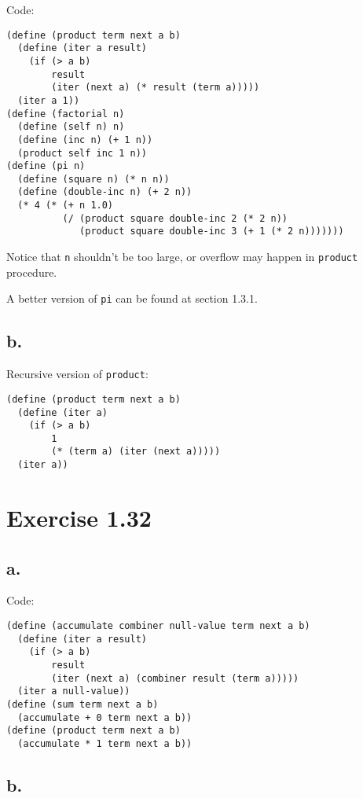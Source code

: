 \documentclass[../main.tex]{subfiles}
\begin{document}
Code:

\begin{lstlisting}
(define (product term next a b)
  (define (iter a result)
    (if (> a b)
        result
        (iter (next a) (* result (term a)))))
  (iter a 1))
(define (factorial n)
  (define (self n) n)
  (define (inc n) (+ 1 n))
  (product self inc 1 n))
(define (pi n)
  (define (square n) (* n n))
  (define (double-inc n) (+ 2 n))
  (* 4 (* (+ n 1.0)
          (/ (product square double-inc 2 (* 2 n))
             (product square double-inc 3 (+ 1 (* 2 n)))))))
\end{lstlisting}

Notice that \lstinline{n} shouldn't be
 too large, or overflow may happen in
 \lstinline{product} procedure.

A better version of \lstinline{pi} can
 be found at section 1.3.1.

\subsection*{b.}

Recursive version of \lstinline{product}:

\begin{lstlisting}
(define (product term next a b)
  (define (iter a)
    (if (> a b)
        1
        (* (term a) (iter (next a)))))
  (iter a))
\end{lstlisting}

\section{Exercise 1.32}

\subsection*{a.}

Code:

\begin{lstlisting}
(define (accumulate combiner null-value term next a b)
  (define (iter a result)
    (if (> a b)
        result
        (iter (next a) (combiner result (term a)))))
  (iter a null-value))
(define (sum term next a b)
  (accumulate + 0 term next a b))
(define (product term next a b)
  (accumulate * 1 term next a b))
\end{lstlisting}

\subsection*{b.}
\end{document}
